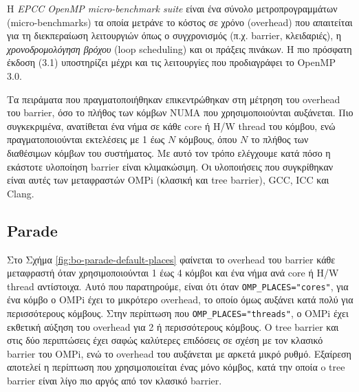 Η \textit{EPCC OpenMP micro-benchmark suite} \cite{bull1999measuring} είναι ένα σύνολο μετροπρογραμμάτων (micro-benchmarks) τα οποία μετράνε το κόστος σε χρόνο (overhead) που απαιτείται για τη διεκπεραίωση λειτουργιών όπως ο συγχρονισμός (π.χ. barrier, κλειδαριές), η \textit{χρονοδρομολόγηση βρόχου} (loop scheduling) και οι πράξεις πινάκων. Η πιο πρόσφατη έκδοση (3.1) υποστηρίζει μέχρι και τις λειτουργίες που προδιαγράφει το OpenMP 3.0.

Τα πειράματα που πραγματοποιήθηκαν επικεντρώθηκαν στη μέτρηση του overhead του barrier, όσο το πλήθος των κόμβων NUMA που χρησιμοποιούνται αυξάνεται. Πιο συγκεκριμένα, ανατίθεται ένα νήμα σε κάθε core ή H/W thread του κόμβου, ενώ πραγματοποιούνται εκτελέσεις με 1 έως $N$ κόμβους, όπου $N$ το πλήθος των διαθέσιμων κόμβων του συστήματος.
 Με αυτό τον τρόπο ελέγχουμε κατά πόσο η εκάστοτε υλοποίηση barrier είναι κλιμακώσιμη. Οι υλοποιήσεις που συγκρίθηκαν είναι αυτές των μεταφραστών OMPi (κλασική και tree barrier), GCC, ICC και Clang.


\subsection{Parade}
Στο Σχήμα \ref{fig:bo-parade-default-places} φαίνεται το overhead του barrier κάθε μεταφραστή όταν χρησιμοποιούνται 1 έως 4 κόμβοι και ένα νήμα ανά core ή H/W thread αντίστοιχα. Αυτό που παρατηρούμε, είναι ότι όταν \texttt{OMP\_PLACES="cores"}, για ένα κόμβο ο OMPi έχει το μικρότερο overhead, το οποίο όμως αυξάνει κατά πολύ για περισσότερους κόμβους. Στην περίπτωση που \texttt{OMP\_PLACES="threads"}, ο OMPi έχει εκθετική αύξηση του overhead για 2 ή περισσότερους κόμβους. Ο tree barrier και στις δύο περιπτώσεις έχει σαφώς καλύτερες επιδόσεις σε σχέση με τον κλασικό barrier του OMPi, ενώ το overhead του αυξάνεται με αρκετά μικρό ρυθμό. Εξαίρεση αποτελεί η περίπτωση που χρησιμοποιείται ένας μόνο κόμβος, κατά την οποία o tree barrier είναι λίγο πιο αργός από τον κλασικό barrier. %

%


